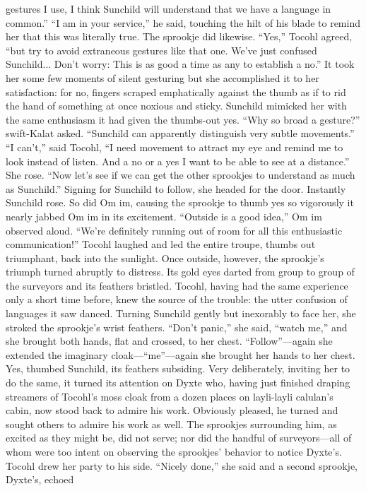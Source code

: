 \documentclass[9pt]{article}
\begin{document}
gestures I use, I think Sunchild will understand that we have a language in common.”
“I am in your service,” he said, touching the hilt of his blade to remind her that this was literally true.
The sprookje did likewise.
“Yes,” Tocohl agreed, “but try to avoid extraneous gestures like that one. We’ve just confused
Sunchild... Don’t worry: This is as good a time as any to establish a no.”
It took her some few moments of silent gesturing but she accomplished it to her satisfaction: for no,
fingers scraped emphatically against the thumb as if to rid the hand of something at once noxious and
sticky. Sunchild mimicked her with the same enthusiasm it had given the thumbs-out yes.
“Why so broad a gesture?” swift-Kalat asked. “Sunchild can apparently distinguish very subtle
movements.”
“I can’t,” said Tocohl, “I need movement to attract my eye and remind me to look instead of listen.
And a no or a yes I want to be able to see at a distance.” She rose. “Now let’s see if we can get the
other sprookjes to understand as much as Sunchild.” Signing for Sunchild to follow, she headed for the
door.
Instantly Sunchild rose. So did Om im, causing the sprookje to thumb yes so vigorously it nearly
jabbed Om im in its excitement. “Outside is a good idea,” Om im observed aloud. “We’re definitely
running out of room for all this enthusiastic communication!”
Tocohl laughed and led the entire troupe, thumbs out triumphant, back into the sunlight.
Once outside, however, the sprookje’s triumph turned abruptly to distress. Its gold eyes darted from
group to group of the surveyors and its feathers bristled.
Tocohl, having had the same experience only a short time before, knew the source of the trouble: the
utter confusion of languages it saw danced. Turning Sunchild gently but inexorably to face her, she
stroked the sprookje’s wrist feathers. “Don’t panic,” she said, “watch me,” and she brought both hands,
flat and crossed, to her chest. “Follow”—again she extended the imaginary cloak—“me”—again she
brought her hands to her chest.
Yes, thumbed Sunchild, its feathers subsiding.
Very deliberately, inviting her to do the same, it turned its attention on Dyxte who, having just finished
draping streamers of Tocohl’s moss cloak from a dozen places on layli-layli calulan’s cabin, now stood
back to admire his work. Obviously pleased, he turned and sought others to admire his work as well.
The sprookjes surrounding him, as excited as they might be, did not serve; nor did the handful of
surveyors—all of whom were too intent on observing the sprookjes’ behavior to notice Dyxte’s.
Tocohl drew her party to his side. “Nicely done,” she said and a second sprookje, Dyxte’s, echoed
\end{document}
